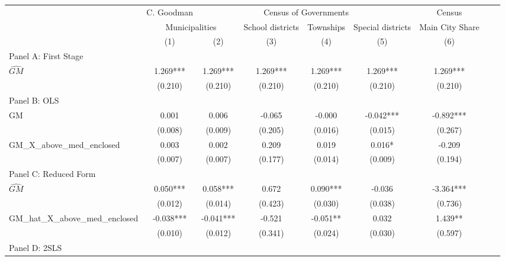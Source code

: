  \begin{tabular}{l*{8}{c}} \toprule
&\multicolumn{1}{c}{C. Goodman}&\multicolumn{4}{c}{Census of Governments}&\multicolumn{1}{c}{Census}\\\cmidrule(lr){2-2}\cmidrule(lr){3-6}\cmidrule(lr){7-7}
&\multicolumn{2}{c}{Municipalities}&\multicolumn{1}{c}{School districts}&\multicolumn{1}{c}{Townships}&\multicolumn{1}{c}{Special districts}&\multicolumn{1}{c}{Main City Share}\\\cmidrule(lr){2-3}\cmidrule(lr){4-6}\cmidrule(lr){7-7}
&\multicolumn{1}{c}{(1)}&\multicolumn{1}{c}{(2)}&\multicolumn{1}{c}{(3)}&\multicolumn{1}{c}{(4)}&\multicolumn{1}{c}{(5)}&\multicolumn{1}{c}{(6)}\\
\cmidrule(lr){1-7}
\multicolumn{6}{l}{Panel A: First Stage}\\
\cmidrule(lr){1-7}
$\widehat{GM}$  &    1.269***&    1.269***&    1.269***&    1.269***&    1.269***&    1.269***\\
                &  (0.210)   &  (0.210)   &  (0.210)   &  (0.210)   &  (0.210)   &  (0.210)   \\
\cmidrule(lr){1-7}
\multicolumn{6}{l}{Panel B: OLS}\\
\cmidrule(lr){1-7}
GM              &    0.001   &    0.006   &   -0.065   &   -0.000   &   -0.042***&   -0.892***\\
                &  (0.008)   &  (0.009)   &  (0.205)   &  (0.016)   &  (0.015)   &  (0.267)   \\
\addlinespace
GM\_X\_above\_med\_enclosed&    0.003   &    0.002   &    0.209   &    0.019   &    0.016*  &   -0.209   \\
                &  (0.007)   &  (0.007)   &  (0.177)   &  (0.014)   &  (0.009)   &  (0.194)   \\
\cmidrule(lr){1-7}
\multicolumn{6}{l}{Panel C: Reduced Form}\\
\cmidrule(lr){1-7}
$\widehat{GM}$  &    0.050***&    0.058***&    0.672   &    0.090***&   -0.036   &   -3.364***\\
                &  (0.012)   &  (0.014)   &  (0.423)   &  (0.030)   &  (0.038)   &  (0.736)   \\
\addlinespace
GM\_hat\_X\_above\_med\_enclosed&   -0.038***&   -0.041***&   -0.521   &   -0.051** &    0.032   &    1.439** \\
                &  (0.010)   &  (0.012)   &  (0.341)   &  (0.024)   &  (0.030)   &  (0.597)   \\
\cmidrule(lr){1-7}
\multicolumn{6}{l}{Panel D: 2SLS}\\

\end{tabular}
